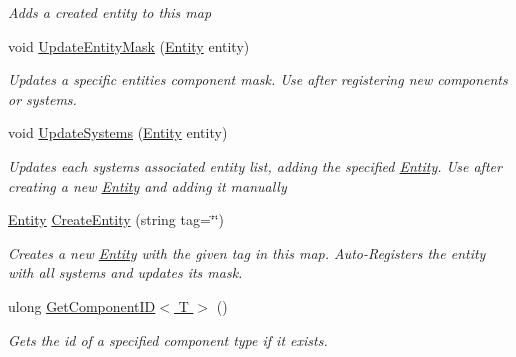 \begin{DoxyCompactItemize}
\begin{DoxyCompactList}\small\item\em Adds a created entity to this map \end{DoxyCompactList}\item 
void \hyperlink{class_midnight_blue_1_1_engine_1_1_entity_component_1_1_entity_map_ae719ec7cdc2b4311590ca22674d47bf0}{Update\+Entity\+Mask} (\hyperlink{class_midnight_blue_1_1_engine_1_1_entity_component_1_1_entity}{Entity} entity)
\begin{DoxyCompactList}\small\item\em Updates a specific entities component mask. Use after registering new components or systems. \end{DoxyCompactList}\item 
void \hyperlink{class_midnight_blue_1_1_engine_1_1_entity_component_1_1_entity_map_abecc0cc62b145f8d44661b56e06fb06e}{Update\+Systems} (\hyperlink{class_midnight_blue_1_1_engine_1_1_entity_component_1_1_entity}{Entity} entity)
\begin{DoxyCompactList}\small\item\em Updates each systems associated entity list, adding the specified \hyperlink{class_midnight_blue_1_1_engine_1_1_entity_component_1_1_entity}{Entity}. Use after creating a new \hyperlink{class_midnight_blue_1_1_engine_1_1_entity_component_1_1_entity}{Entity} and adding it manually \end{DoxyCompactList}\item 
\hyperlink{class_midnight_blue_1_1_engine_1_1_entity_component_1_1_entity}{Entity} \hyperlink{class_midnight_blue_1_1_engine_1_1_entity_component_1_1_entity_map_acb6bf0e0819a14f67678fe5d79582579}{Create\+Entity} (string tag=\char`\"{}\char`\"{})
\begin{DoxyCompactList}\small\item\em Creates a new \hyperlink{class_midnight_blue_1_1_engine_1_1_entity_component_1_1_entity}{Entity} with the given tag in this map. Auto-\/\+Registers the entity with all systems and updates its mask. \end{DoxyCompactList}\item 
ulong \hyperlink{class_midnight_blue_1_1_engine_1_1_entity_component_1_1_entity_map_ae4068faba4d37d5443ac5cf7a3e7b6dd}{Get\+Component\+I\+D$<$ T $>$} ()
\begin{DoxyCompactList}\small\item\em Gets the id of a specified component type if it exists. \end{DoxyCompactList}\item 

\end{DoxyCompactItemize}
